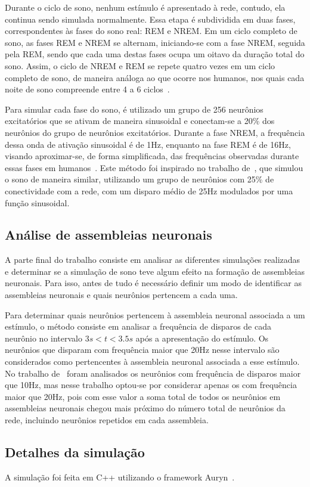 Durante o ciclo de sono, nenhum estímulo é apresentado à rede, contudo, ela continua sendo simulada normalmente. Essa etapa é
subdividida em duas fases, correspondentes às fases do sono real: REM e NREM. Em um ciclo completo de sono, as fases REM e NREM se
alternam, iniciando-se com a fase NREM, seguida pela REM, sendo que cada uma destas fases ocupa um oitavo da duração total do
sono. Assim, o ciclo de NREM e REM se repete quatro vezes em um ciclo completo de sono, de maneira análoga ao que ocorre nos
humanos, nos quais cada noite de sono compreende entre 4 a 6 ciclos~\cite{patelPhysiology2023}.

Para simular cada fase do sono, é utilizado um grupo de 256 neurônios excitatórios que se ativam de maneira sinusoidal e
conectam-se a 20\% dos neurônios do grupo de neurônios excitatórios. Durante a fase NREM, a frequência dessa onda de ativação
sinusoidal é de 1Hz, enquanto na fase REM é de 16Hz, visando aproximar-se, de forma simplificada, das frequências observadas
durante essas fases em humanos~\cite{guoSlow2022, cowdinTheta2014}. Este método foi inspirado no trabalho de~, que
simulou o sono de maneira similar, utilizando um grupo de neurônios com 25\% de conectividade com a rede, com um disparo médio de
25Hz modulados por uma função sinusoidal.

\subsection{Análise de assembleias neuronais}

A parte final do trabalho consiste em analisar as diferentes simulações realizadas e determinar se a simulação de sono teve algum
efeito na formação de assembleias neuronais. Para isso, antes de tudo é necessário definir um modo de identificar as assembleias
neuronais e quais neurônios pertencem a cada uma.

Para determinar quais neurônios pertencem à assembleia neuronal associada a um estímulo, o método consiste em analisar a
frequência de disparos de cada neurônio no intervalo $3s < t < 3.5s$ após a apresentação do estímulo. Os neurônios que disparam
com frequência maior que 20Hz nesse intervalo são considerados como pertencentes à assembleia neuronal associada a esse estímulo.
No trabalho de~ foram analisados os neurônios com frequência de disparos maior que 10Hz, mas nesse
trabalho optou-se por considerar apenas os com frequência maior que 20Hz, pois com esse valor a soma total de todos os neurônios
em assembleias neuronais chegou mais próximo do número total de neurônios da rede, incluindo neurônios repetidos em cada
assembleia.

\subsection{Detalhes da simulação}

A simulação foi feita em C++ utilizando o framework Auryn~\cite{zenkeLimits2014}.


